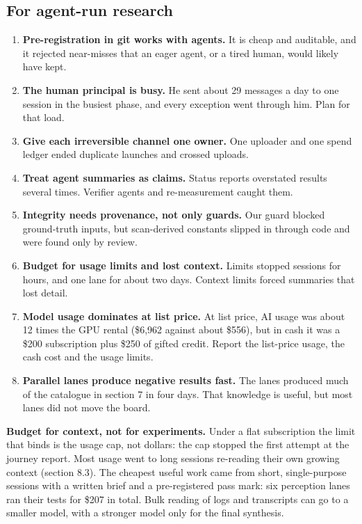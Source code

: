 \documentclass[11pt]{article}
\begin{document}
\subsection{For agent-run research}
\begin{enumerate}[itemsep=2pt,topsep=3pt]
\item \textbf{Pre-registration in git works with agents.} It is cheap and auditable, and it rejected near-misses that an eager agent, or a tired human, would likely have kept.
\item \textbf{The human principal is busy.} He sent about 29 messages a day to one session in the busiest phase, and every exception went through him. Plan for that load.
\item \textbf{Give each irreversible channel one owner.} One uploader and one spend ledger ended duplicate launches and crossed uploads.
\item \textbf{Treat agent summaries as claims.} Status reports overstated results several times. Verifier agents and re-measurement caught them.
\item \textbf{Integrity needs provenance, not only guards.} Our guard blocked ground-truth inputs, but scan-derived constants slipped in through code and were found only by review.
\item \textbf{Budget for usage limits and lost context.} Limits stopped sessions for hours, and one lane for about two days. Context limits forced summaries that lost detail.
\item \textbf{Model usage dominates at list price.} At list price, AI usage was about 12 times the GPU rental (\$6,962 against about \$556), but in cash it was a \$200 subscription plus \$250 of gifted credit. Report the list-price usage, the cash cost and the usage limits.
\item \textbf{Parallel lanes produce negative results fast.} The lanes produced much of the catalogue in section 7 in four days. That knowledge is useful, but most lanes did not move the board.
\end{enumerate}
\textbf{Budget for context, not for experiments.} Under a flat subscription the limit that binds is the usage cap, not dollars: the cap stopped the first attempt at the journey report. Most usage went to long sessions re-reading their own growing context (section 8.3). The cheapest useful work came from short, single-purpose sessions with a written brief and a pre-registered pass mark: six perception lanes ran their tests for \$207 in total. Bulk reading of logs and transcripts can go to a smaller model, with a stronger model only for the final synthesis.
\end{document}
